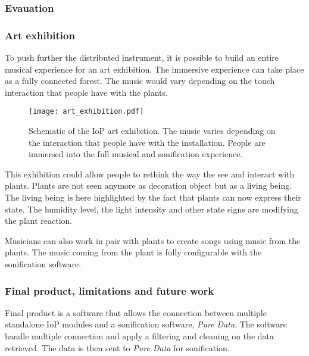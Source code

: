 \subsubsection{Evauation}


\subsubsection{Art exhibition}

To push further the distributed instrument, it is possible to build an entire
musical experience for an art exhibition.
The immersive experience can take place as a fully connected forest. The music would vary
depending on the touch interaction that people have with the plants.

\begin{figure}[h!]
    \centering
    \texttt{[image: art\_exhibition.pdf]}
    \caption{Schematic of the IoP art exhibition. The music varies depending on the
        interaction that people have with the installation. People are immersed into the full
        musical and sonification experience.}
    \vspace{0.1cm}
    \label{fig:art_exhibition}
\end{figure}

This exhibition could allow people to rethink the way the see and interact with plants.
Plants are not seen anymore as decoration object but as a living being.
The living being is here highlighted by the fact that plants can now express their state.
The humidity level, the light intensity and other state signs are modifying the plant
reaction.


Musicians can also work in pair with plants to create songs using music from the plants.
The music coming from the plant is fully configurable with the sonification software.


\subsubsection{Final product, limitations and future work}

Final product is a software that allows the connection between multiple standalone IoP modules and a sonification software, \textit{Pure Data}. The software handle multiple connection and apply a filtering and cleaning on the data
retrieved. The data is then sent to \textit{Pure Data} for sonification.

